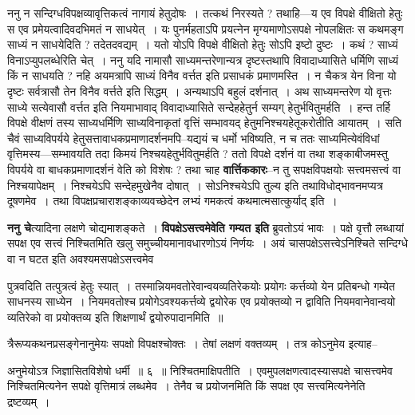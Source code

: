 \documentclass[article,12pt,a4paper]{memoir}
\begin{document}
	  \pstart ननु न सन्दिग्धविपक्षव्यावृत्तिकत्वं नागायं हेतुदोषः । तत्कथं निरस्यते ? तथाहि—य एव विपक्षे वीक्षितो हेतुः स एव प्रमेयत्वादिवदभिमतं न साधयेत् । यः पुनर्महताऽपि प्रयत्नेन मृग्यमाणोऽसपक्षे नोपलक्षितः स कथमङ्ग साध्यं न साधयेदिति ? तदेतदवद्यम् । यतो योऽपि विपक्षे वीक्षितो हेतुः सोऽपि इष्टो दुष्टः । कथं ? साध्यं विनाऽप्युपलब्धेरिति चेत् । ननु यदि नामासौ साध्यमन्तरेणान्यत्र दृष्टस्तथापि विवादाध्यासिते धर्मिणि साध्यं किं न साधयति ? नहि अयमत्रापि साध्यं विनैव वर्त्तत इति प्रसाधकं प्रमाणमस्ति । न चैकत्र येन विना यो दृष्टः सर्वत्रासौ तेन विनैव वर्त्तते इति सिद्धम् । अन्यथाऽपि बहुलं दर्शनात् । अथ साध्यमन्तरेण यो वृत्तः साध्ये सत्येवासौ वर्त्तत इति नियमाभावाद् विवादाध्यासिते सन्देहहेतुर्न सम्यग् हेतुर्भवितुमर्हति । हन्त तर्हि विपक्षे वीक्षणं तस्य साध्यधर्मिणि साध्यविनाकृतां वृत्तिं सम्भावयद् हेतुमनिश्चयहेतूकरोतीति आयातम् । सति चैवं साध्यविपर्यये हेतुसत्तावाधकप्रमाणादर्शनमपि--यद्ययं च धर्मो भविष्यति, न च ततः साध्यमित्येवंविधां वृत्तिमस्य—सम्भावयति तदा किमयं निश्चयहेतुर्भवितुमर्हति ? ततो वि\leavevmode{}पक्षे दर्शनं वा तथा शङ्काबीजमस्तु विपर्यये वा बाधकप्रमाणादर्शनं वेति को विशेषः ? तथा चाह \textbf{वार्त्तिककारः}--न तु सपक्षविपक्षयोः सत्त्वमसत्त्वं वा निश्चयापेक्षम् । निश्चयेऽपि सन्देहमुखेनैव दोषात् । सोऽनिश्चयेऽपि तुल्य इति तथाविधोद्भावनमप्यत्र दूषणमेव । तथा विपक्षप्रचाराशङ्काव्यवच्छेदेन लभ्यं गमकत्वं कथमात्मसात्कुर्याद् इति ।
	\pend
      

	  \pstart \textbf{ननु चे}त्यादिना लक्षणे चोद्यमाशङ्कते । \textbf{विपक्षेऽसत्त्वमेवेति गम्यत इति} ब्रुवतोऽयं भावः । पक्षे वृत्तौ लब्धायां सपक्ष एव सत्त्वं निश्चितमिति खलु समुच्चीयमानावधारणोऽयं निर्णयः । अयं चासपक्षेऽसत्त्वेऽनिश्चिते सन्दिग्धे वा न घटत इति अवश्यमसपक्षेऽसत्त्वमेव    \leavevmode{} 
	  
	पुत्रवदिति तत्पुत्रत्वं हेतुः स्यात् । तस्मान्नियमवतोरेवान्वयव्यतिरेकयोः प्रयोगः कर्त्तव्यो येन प्रतिबन्धो गम्येत साधनस्य साध्येन । नियमवतोश्च प्रयोगेऽवश्यकर्त्तव्ये द्वयोरेक एव प्रयोक्तव्यो न द्वाविति नियमवानेवान्वयो व्यतिरेको वा प्रयोक्तव्य इति शिक्षणार्थं द्वयोरुपादानमिति ॥  
	  
	त्रैरूप्यकथनप्रसङ्गेनानुमेयः सपक्षो विपक्षश्चोक्तः । तेषां लक्षणं वक्तव्यम् । तत्र कोऽनुमेय इत्याह-- 
	  
	अनुमेयोऽत्र जिज्ञासितविशेषो धर्मी ॥ ६ ॥ निश्चितमाक्षिपतीति । एवमुपलक्षणत्वादस्यासपक्षे चासत्त्वमेव निश्चितमित्यनेन सपक्षे वृत्तिमात्रं लब्धमेव । तेनैव च प्रयोजनमिति किं सपक्ष एव सत्त्वमित्यनेनेति द्रष्टव्यम् ।
	\pend
      
\end{document}
